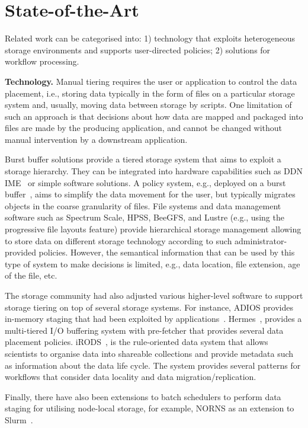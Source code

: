 \documentclass{superfri}
\begin{document}
\section{State-of-the-Art}
\label{sec:art}

Related work can be categorised into:
1) technology that exploits heterogeneous storage environments and supports user-directed policies;
2) solutions for workflow processing.

\textbf{Technology.}
Manual tiering requires the user or application to control the data placement, i.e., storing data typically in the form of files on a particular storage system and, usually, moving data between storage by scripts.
One limitation of such an approach is that decisions about how data are mapped and packaged into files are made by the producing application, and cannot be changed without manual intervention by a downstream application.

Burst buffer solutions provide a tiered storage system that aims to exploit a storage hierarchy.
They can be integrated into hardware capabilities such as DDN IME~\cite{BODIAIFSFI19} or simple software solutions.
A policy system, e.g., deployed on a burst buffer~\cite{RomanusRP15}, aims to simplify the data movement for the user, but typically migrates objects in the coarse granularity of files.
File systems and data management software such as Spectrum Scale, HPSS, BeeGFS, and Lustre (e.g., using the progressive file layouts feature) provide hierarchical storage management allowing to store data on different storage technology according to such administrator-provided policies.
However, the semantical information that can be used by this type of system to make decisions is limited, e.g., data location, file extension, age of the file, etc.

The storage community had also adjusted various higher-level software to support storage tiering on top of several storage systems. For instance, ADIOS provides in-memory staging that had been exploited by applications~\cite{slawinska2013maya}.
Hermes~\cite{kougkas2020acceleration}, provides a multi-tiered I/O buffering system with pre-fetcher that provides several data placement policies.
iRODS~\cite{rajasekar2010irods}, is the rule-oriented data system that allows scientists to organise data into shareable collections and provide metadata such as information about the data life cycle.
The system provides several patterns for workflows that consider data locality and data migration/replication.

Finally, there have also been extensions to batch schedulers to perform data staging for utilising node-local storage, for example, NORNS as an extension to Slurm~\cite{miranda2019norns}.
\end{document}
